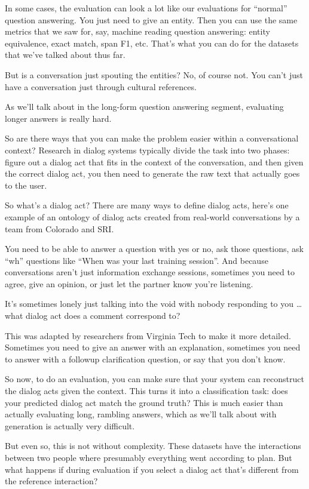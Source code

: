 In some cases, the evaluation can look a lot like our evaluations for “normal” question answering.  You just need to give an entity.  Then you can use the same metrics that we saw for, say, machine reading question answering: entity equivalence, exact match, span F1, etc.  That’s what you can do for the datasets that we’ve talked about thus far.

But is a conversation just spouting the entities?  No, of course not.  You can’t just have a conversation just through cultural references.  

As we’ll talk about in the long-form question answering segment, evaluating longer answers is really hard.  

So are there ways that you can make the problem easier within a conversational context?  Research in dialog systems typically divide the task into two phases: figure out a dialog act that fits in the context of the conversation, and then given the correct dialog act, you then need to generate the raw text that actually goes to the user. 

So what’s a dialog act?  There are many ways to define dialog acts, here’s one example of an ontology of dialog acts created from real-world conversations by a team from Colorado and SRI.  

You need to be able to answer a question with yes or no, ask those questions, ask “wh” questions like “When was your last training session”.  And because conversations aren’t just information exchange sessions, sometimes you need to agree, give an opinion, or just let the partner know you’re listening.  

It’s sometimes lonely just talking into the void with nobody responding to you … what dialog act does a comment correspond to?

This was adapted by researchers from Virginia Tech to make it more detailed.  Sometimes you need to give an answer with an explanation, sometimes you need to answer with a followup clarification question, or say that you don’t know.

So now, to do an evaluation, you can make sure that your system can reconstruct the dialog acts given the context.  This turns it into a classification task: does your predicted dialog act match the ground truth?  This is much easier than actually evaluating long, rambling answers, which as we’ll talk about with generation is actually very difficult.

But even so, this is not without complexity.  These datasets have the interactions between two people where presumably everything went according to plan.  But what happens if during evaluation if you select a dialog act that’s different from the reference interaction?

